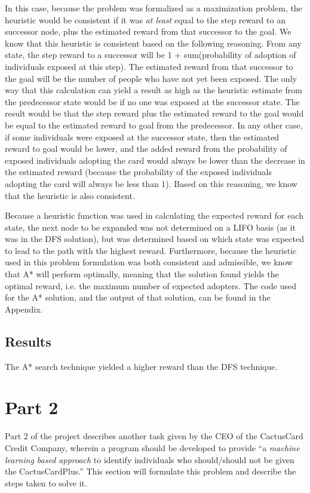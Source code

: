 \documentclass[11pt,journal]{IEEEtran}
\begin{document}
In this case, because the problem was formalized as a maximization problem, the heuristic would be consistent if it was \textit{at least} equal to the step reward to an successor node, plus the estimated reward from that successor to the goal. We know that this heuristic is consistent based on the following reasoning. From any state, the step reward to a successor will be 1 + sum(probability of adoption of individuals exposed at this step). The estimated reward from that successor to the goal will be the number of people who have not yet been exposed. The only way that this calculation can yield a result as high as the heuristic estimate from the predecessor state would be if no one was exposed at the successor state. The result would be that the step reward plus the estimated reward to the goal would be equal to the estimated reward to goal from the predecessor. In any other case, if some individuals were exposed at the successor state, then the estimated reward to goal would be lower, and the added reward from the probability of exposed individuals adopting the card would always be lower than the decrease in the estimated reward (because the probability of the exposed individuals adopting the card will always be less than 1). Based on this reasoning, we know that the heuristic is also consistent.

Because a heuristic function was used in calculating the expected reward for each state, the next node to be expanded was not determined on a LIFO basis (as it was in the DFS solution), but was determined based on which state was expected to lead to the path with the highest reward. Furthermore, because the heuristic used in this problem formulation was both consistent and admissible, we know that A* will perform optimally, meaning that the solution found yields the optimal reward, i.e. the maximum number of expected adopters. The code used for the A* solution, and the output of that solution, can be found in the Appendix.

\subsection{Results}
The A* search technique yielded a higher reward than the DFS technique.

\section{Part 2} \label{part2}
Part 2 of the project describes another task given by the CEO of the CactusCard Credit Company, wherein a program should be developed to provide ``a \emph{machine learning based approach} to identify individuals who should/should not be given the CactusCardPlus.'' This section will formulate this problem and describe the steps taken to solve it.
\end{document}
